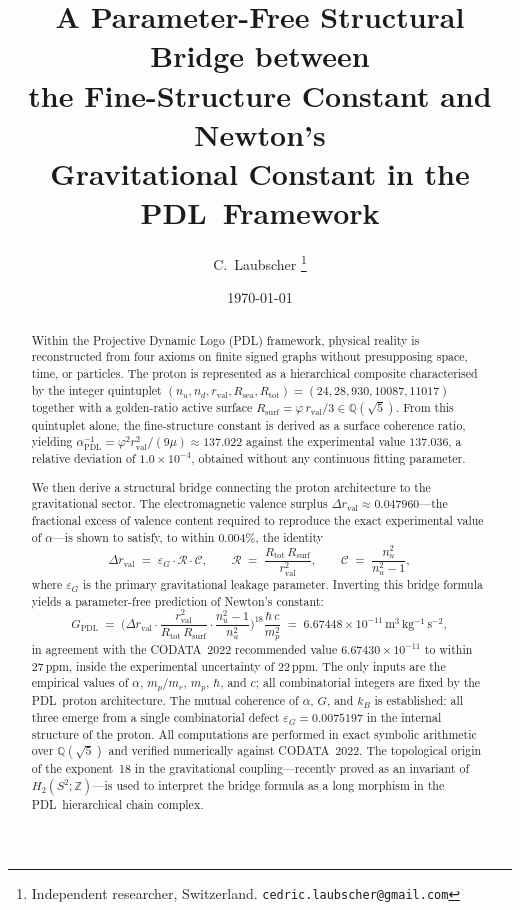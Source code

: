 \documentclass[11pt,a4paper]{article}
\theoremstyle{definition}
\newcommand{\PDL}{\textnormal{PDL}}
\newcommand{\Rsurf}{R_{\mathrm{surf}}}
\newcommand{\Rsea}{R_{\mathrm{sea}}}
\newcommand{\Rtot}{R_{\mathrm{tot}}}
\newcommand{\rval}{r_{\mathrm{val}}}
\newcommand{\epsg}{\varepsilon_G}
\newcommand{\alphaPDL}{\alpha_{\mathrm{PDL}}}
\newcommand{\GPDL}{G_{\mathrm{PDL}}}
\newcommand{\calR}{\mathcal{R}}
\newcommand{\calC}{\mathcal{C}}
\newcommand{\vp}{\varphi}
\newcommand{\drval}{\Delta r_{\mathrm{val}}}
\begin{document}
\title{%
  A Parameter-Free Structural Bridge between\\[4pt]
  the Fine-Structure Constant and Newton's\\[4pt]
  Gravitational Constant in the \PDL\ Framework%
}
\author{%
  C.~Laubscher%
  \thanks{Independent researcher, Switzerland.
    \texttt{cedric.laubscher@gmail.com}}\\[4pt]%
}
\date{\small \today}
\maketitle

\begin{abstract}
Within the Projective Dynamic Logo (\PDL) framework, physical reality is reconstructed from four axioms on finite signed graphs without presupposing space, time, or particles. The proton is represented as a hierarchical composite characterised by the integer quintuplet $(n_u, n_d, \rval, \Rsea, \Rtot) = (24, 28, 930, 10087, 11017)$ together with a golden-ratio active surface $\Rsurf = \vp\,\rval/3 \in \mathbb{Q}(\sqrt{5})$. From this quintuplet alone, the fine-structure constant is derived as a surface coherence ratio, yielding $\alphaPDL^{-1} = \vp^2\rval^2/(9\mu) \approx 137.022$ against the experimental value $137.036$, a relative deviation of $1.0 \times 10^{-4}$, obtained without any continuous fitting parameter.

We then derive a structural bridge connecting the proton architecture to the gravitational sector. The electromagnetic valence surplus $\drval \approx 0.047960$---the fractional excess of valence content required to reproduce the exact experimental value of $\alpha$---is shown to satisfy, to within $0.004\%$, the identity
\[
  \drval \;=\; \epsg \cdot \calR \cdot \calC,
  \qquad
  \calR \;=\; \frac{\Rtot\,\Rsurf}{\rval^2}, \qquad
  \calC \;=\; \frac{n_u^2}{n_u^2 - 1},
\]
where $\epsg$ is the primary gravitational leakage parameter. Inverting this bridge formula yields a parameter-free prediction of Newton's constant:
\[
  \GPDL \;=\;
  \Biggl(\drval\cdot\frac{\rval^2}{\Rtot\,\Rsurf}\cdot
         \frac{n_u^2-1}{n_u^2}\Biggr)^{\!18}
  \frac{\hbar\,c}{m_p^2}
  \;=\; 6.67448 \times 10^{-11}\,\mathrm{m^3\,kg^{-1}\,s^{-2}},
\]
in agreement with the CODATA~2022 recommended value $6.67430 \times 10^{-11}$ to within $27\,\mathrm{ppm}$, inside the experimental uncertainty of $22\,\mathrm{ppm}$. The only inputs are the empirical values of $\alpha$, $m_p/m_e$, $m_p$, $\hbar$, and $c$; all combinatorial integers are fixed by the \PDL\ proton architecture. The mutual coherence of $\alpha$, $G$, and $k_B$ is established: all three emerge from a single combinatorial defect $\epsg = 0.0075197$ in the internal structure of the proton. All computations are performed in exact symbolic arithmetic over $\mathbb{Q}(\sqrt{5})$ and verified numerically against CODATA~2022. The topological origin of the exponent~18 in the gravitational coupling---recently proved as an invariant of $H_2(S^2;\mathbb{Z})$---is used to interpret the bridge formula as a long morphism in the \PDL\ hierarchical chain complex.
\end{abstract}
\end{document}
